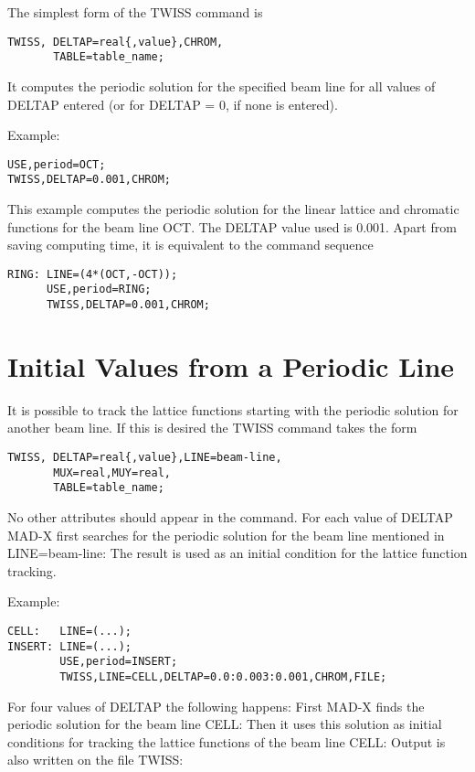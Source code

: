 The simplest form of the TWISS command is 
\begin{verbatim}
TWISS, DELTAP=real{,value},CHROM,
       TABLE=table_name;
\end{verbatim}

It computes the periodic solution for the specified beam line for all values of DELTAP entered (or for DELTAP = 0, if none is entered). 

Example: 
\begin{verbatim}
USE,period=OCT;
TWISS,DELTAP=0.001,CHROM;
\end{verbatim}

This example computes the periodic solution for the linear lattice and chromatic functions for the beam line OCT. The DELTAP value used is 0.001. Apart from saving computing time, it is equivalent to the command sequence 
\begin{verbatim}
RING: LINE=(4*(OCT,-OCT));
      USE,period=RING;
      TWISS,DELTAP=0.001,CHROM;
\end{verbatim}

\section{Initial Values from a Periodic Line}

It is possible to track the lattice functions starting with the periodic solution for another beam line. If this is desired the TWISS command takes the form 
\begin{verbatim}
TWISS, DELTAP=real{,value},LINE=beam-line,
       MUX=real,MUY=real,
       TABLE=table_name;
\end{verbatim}

No other attributes should appear in the command. For each value of DELTAP MAD-X first searches for the periodic solution for the beam line mentioned in LINE=beam-line: The result is used as an initial condition for the lattice function tracking. 

Example: 
\begin{verbatim}
CELL:   LINE=(...);
INSERT: LINE=(...);
        USE,period=INSERT;
        TWISS,LINE=CELL,DELTAP=0.0:0.003:0.001,CHROM,FILE;
\end{verbatim}

For four values of DELTAP the following happens: First MAD-X finds the periodic solution for the beam line CELL: Then it uses this solution as initial conditions for tracking the lattice functions of the beam line CELL: Output is also written on the file TWISS: 

